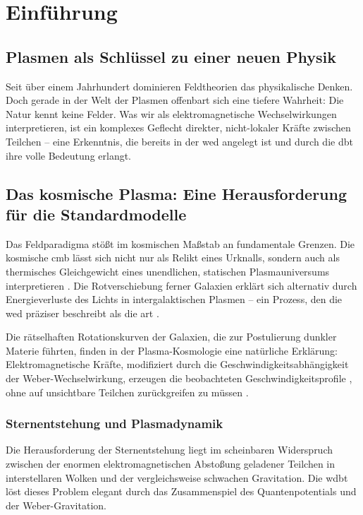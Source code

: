 \chapter{Einführung}
\section{Plasmen als Schlüssel zu einer neuen Physik}
Seit über einem Jahrhundert dominieren Feldtheorien das physikalische Denken. Doch gerade in der Welt der Plasmen offenbart sich eine tiefere Wahrheit: Die Natur kennt keine Felder. Was wir als
elektromagnetische Wechselwirkungen interpretieren, ist ein komplexes Geflecht direkter, nicht-lokaler Kräfte zwischen Teilchen – eine Erkenntnis, die bereits in der \gls{wed} angelegt ist und durch
die \gls{dbt} ihre volle Bedeutung erlangt.

\section{Das kosmische Plasma: Eine Herausforderung für die Standardmodelle}
Das Feldparadigma stößt im kosmischen Maßstab an fundamentale Grenzen. Die kosmische \gls{cmb} lässt sich nicht nur als Relikt eines Urknalls, sondern auch als thermisches Gleichgewicht eines
unendlichen, statischen Plasmauniversums interpretieren \cite{Arp1998}. Die Rotverschiebung ferner Galaxien erklärt sich alternativ durch Energieverluste des Lichts in intergalaktischen Plasmen – ein Prozess,
den die \gls{wed} präziser beschreibt als die \gls{art} \cite{einstein1915,LaViolette2010}.

Die rätselhaften Rotationskurven der Galaxien, die zur Postulierung dunkler Materie führten, finden in der Plasma-Kosmologie eine natürliche Erklärung: Elektromagnetische Kräfte, modifiziert durch
die Geschwindigkeitsabhängigkeit der Weber-Wechselwirkung, erzeugen die beobachteten Geschwindigkeitsprofile \cite{rubin1970}, ohne auf unsichtbare Teilchen zurückgreifen zu müssen \cite{Milgrom2015}.

\subsection{Sternentstehung und Plasmadynamik}
Die Herausforderung der Sternentstehung liegt im scheinbaren Widerspruch zwischen der enormen elektromagnetischen Abstoßung geladener Teilchen in interstellaren Wolken und der vergleichsweise
schwachen Gravitation. Die \gls{wdbt} löst dieses Problem elegant durch das Zusammenspiel des Quantenpotentials und der Weber-Gravitation.

